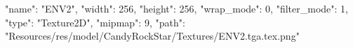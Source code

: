 {
  "name": "ENV2",
  "width": 256,
  "height": 256,
  "wrap_mode": 0,
  "filter_mode": 1,
  "type": "Texture2D",
  "mipmap": 9,
  "path": "Resources/res/model/CandyRockStar/Textures/ENV2.tga.tex.png"
}